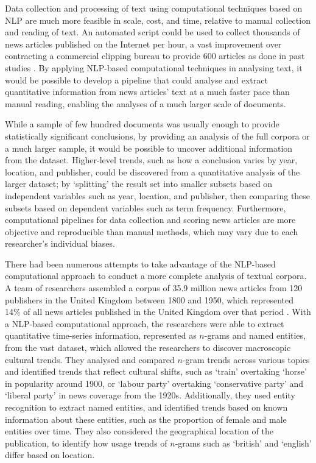 \documentclass{report}
\begin{document}
Data collection and processing of text using computational techniques based on NLP are much more feasible in scale, cost, and time, relative to manual collection and reading of text. 
An automated script could be used to collect thousands of news articles published on the Internet per hour, a vast improvement over contracting a commercial clipping bureau to provide 600 articles as done in past studies \cite{coverdale2002depictions}.
By applying NLP-based computational techniques in analysing text, it would be possible to develop a pipeline that could analyse and extract quantitative information from news articles' text at a much faster pace than manual reading, enabling the analyses of a much larger scale of documents.

While a sample of few hundred documents was usually enough to provide statistically significant conclusions, by providing an analysis of the full corpora or a much larger sample, it would be possible to uncover additional information from the dataset.
Higher-level trends, such as how a conclusion varies by year, location, and publisher, could be discovered from a quantitative analysis of the larger dataset; by `splitting' the result set into smaller subsets based on independent variables such as year, location, and publisher, then comparing these subsets based on dependent variables such as term frequency.
Furthermore, computational pipelines for data collection and scoring news articles are more objective and reproducible than manual methods, which may vary due to each researcher's individual biases.

There had been numerous attempts to take advantage of the NLP-based computational approach to conduct a more complete analysis of textual corpora. 
A team of researchers assembled a corpus of 35.9 million news articles from 120 publishers in the United Kingdom between 1800 and 1950, which represented 14\% of all news articles published in the United Kingdom over that period \cite{lansdall2017content}.
With a NLP-based computational approach, the researchers were able to extract quantitative time-series information, represented as $n$-grams and named entities, from the vast dataset, which allowed the researchers to discover macroscopic cultural trends. 
They analysed and compared $n$-gram trends across various topics and identified trends that reflect cultural shifts, such as `train' overtaking `horse' in popularity around 1900, or `labour party' overtaking `conservative party' and `liberal party' in news coverage from the 1920s.
Additionally, they used entity recognition to extract named entities, and identified trends based on known information about these entities, such as the proportion of female and male entities over time.
They also considered the geographical location of the publication, to identify how usage trends of $n$-grams such as `british' and `english' differ based on location.
\end{document}
